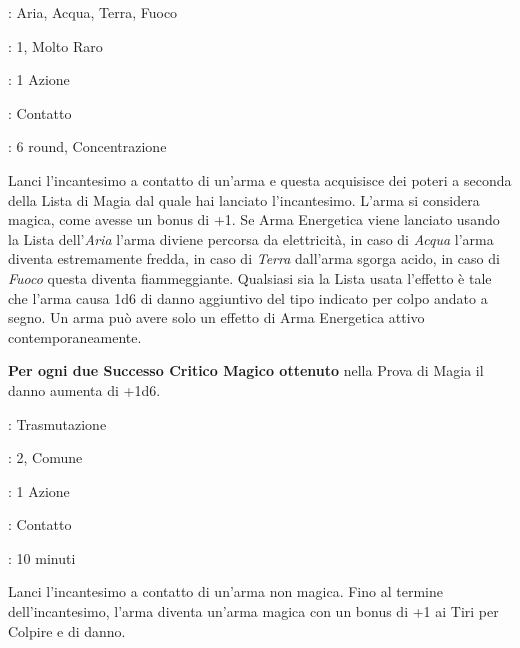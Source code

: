 \begin{multicols}{2}
\noindent\colorbox{OBSSgold!10}{
\begin{minipage}{0.95\linewidth}
\begin{description}[noitemsep, topsep=0pt, parsep=0pt, partopsep=0pt, leftmargin=0cm, labelwidth=1.3cm]
	\item[\textbf{Lista}]: Aria, Acqua, Terra, Fuoco
	\item[\textbf{Livello}]: 1, Molto Raro
	\item[\textbf{Lancio}]: 1 Azione
	\item[\textbf{Gittata}]: Contatto
	\item[\textbf{Durata}]: 6 round, Concentrazione
\end{description}
\end{minipage}}\smallskip

Lanci l'incantesimo a contatto di un'arma e questa acquisisce dei poteri a seconda della Lista di Magia dal quale hai lanciato l'incantesimo. L'arma si considera magica, come avesse un bonus di +1.
Se Arma Energetica viene lanciato usando la Lista dell'\emph{Aria} l'arma diviene percorsa da elettricità, in caso di \emph{Acqua} l'arma diventa estremamente fredda, in caso di \emph{Terra} dall'arma sgorga acido, in caso di \emph{Fuoco} questa diventa fiammeggiante. Qualsiasi sia la Lista usata l'effetto è tale che l'arma causa 1d6 di danno aggiuntivo del tipo indicato per colpo andato a segno.
Un arma può avere solo un effetto di Arma Energetica attivo contemporaneamente.

\textbf{Per ogni due Successo Critico Magico ottenuto} nella Prova di Magia il danno aumenta di +1d6.

\noindent\colorbox{OBSSgold!10}{
\begin{minipage}{0.95\linewidth}
\begin{description}[noitemsep, topsep=0pt, parsep=0pt, partopsep=0pt, leftmargin=0cm, labelwidth=1.3cm]
	\item[\textbf{Lista}]: Trasmutazione
	\item[\textbf{Livello}]: 2, Comune
	\item[\textbf{Lancio}]: 1 Azione
	\item[\textbf{Gittata}]: Contatto
	\item[\textbf{Durata}]: 10 minuti
\end{description}
\end{minipage}}\smallskip

Lanci l'incantesimo a contatto di un'arma non magica. Fino al termine dell'incantesimo, l'arma diventa un'arma magica con un bonus di +1 ai Tiri per Colpire e di danno.


\end{multicols}
